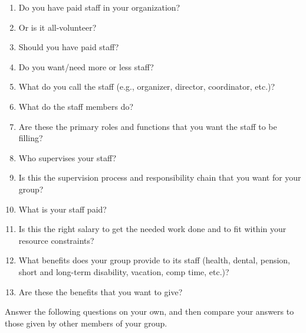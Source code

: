 \begin{enumerate}

\item
  Do you have paid staff in your organization?

\item
  Or is it all-volunteer?

\item
  Should you have paid staff?

\item
  Do you want/need more or less staff?

\item
  What do you call the staff (e.g., organizer, director, coordinator,
  etc.)?

\item
  What do the staff members do?

\item
  Are these the primary roles and functions that you want the staff to
  be filling?

\item
  Who supervises your staff?

\item
  Is this the supervision process and responsibility chain that you want
  for your group?

\item
  What is your staff paid?

\item
  Is this the right salary to get the needed work done and to fit within
  your resource constraints?

\item
  What benefits does your group provide to its staff (health, dental,
  pension, short and long-term disability, vacation, comp time, etc.)?

\item
  Are these the benefits that you want to give?

\end{enumerate}


Answer the following questions on your own, and then compare your
answers to those given by other members of your group.

